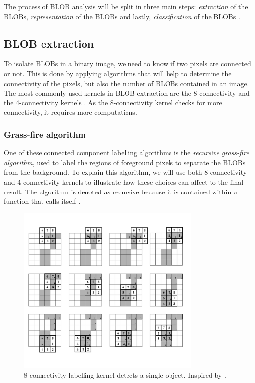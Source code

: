 The process of BLOB analysis will be split in three main steps: \textit{extraction} of the BLOBs, \textit{representation} of the BLOBs and lastly, \textit{classification} of the BLOBs \citep{ip_book}.

\subsection{BLOB extraction}
To isolate BLOBs in a binary image, we need to know if two pixels are connected or not. This is done by applying algorithms that will help to determine the connectivity of the pixels, but also the number of BLOBs contained in an image. The most commonly-used kernels in BLOB extraction are the 8-connectivity and the 4-connectivity kernels \citep{ip_book}. As the 8-connectivity kernel checks for more connectivity, it requires more computations.

\subsubsection{Grass-fire algorithm}
One of these connected component labelling algorithms is the \textit{recursive grass-fire algorithm}, used to label the regions of foreground pixels to separate the BLOBs from the background.
To explain this algorithm, we will use both 8-connectivity and 4-connectivity kernels to illustrate how these choices can affect to the final result. The algorithm is denoted as recursive because it is contained within a function that calls itself \cite{ip_book}.


\begin{figure}[htbp]
\centering
\includegraphics[width=0.8\textwidth]{Pictures/Theory/8connec_kernel.png}
\caption{8-connectivity labelling kernel detects a single object. Inspired by \citep{ip_book}.}
\label{fig:8connecK}
\end{figure}

